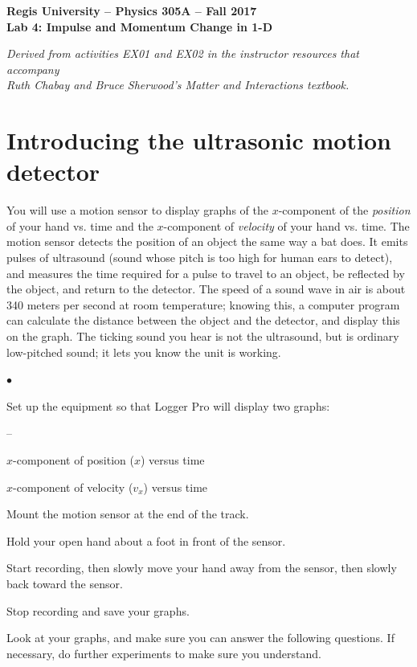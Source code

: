 \documentclass[11pt]{article}
\newcommand{\squishlist}{
   \begin{list}{$\bullet$}
    { \setlength{\itemsep}{0pt}      \setlength{\parsep}{3pt}
      \setlength{\topsep}{3pt}       \setlength{\partopsep}{0pt}
      \setlength{\leftmargin}{1.5em} \setlength{\labelwidth}{1em}
      \setlength{\labelsep}{0.5em} } }
\newcommand{\squishlistB}{
   \begin{list}{--}
    { \setlength{\itemsep}{0pt}      \setlength{\parsep}{3pt}
      \setlength{\topsep}{3pt}       \setlength{\partopsep}{0pt}
      \setlength{\leftmargin}{1.5em} \setlength{\labelwidth}{1em}
      \setlength{\labelsep}{0.5em} } }
\newcommand{\squishend}{
    \end{list}  }
\begin{document}
\begin{center}
\medskip
{\bf{Regis University -- Physics 305A -- Fall 2017}} \\
{\bf{Lab 4: Impulse and Momentum Change in 1-D}} \\
\medskip

{\em\footnotesize {Derived from activities EX01 and EX02 in the instructor resources that
 accompany \\ Ruth Chabay and Bruce Sherwood's {\em Matter and Interactions} 
 textbook.}}
\medskip
\end{center}

\section{Introducing the ultrasonic motion detector}

You will use a motion sensor to display graphs of the $x$-component of the {\em position} of your hand vs. time and the $x$-component of {\em velocity} of your hand vs. time.  The motion sensor detects the position of an object the same way a bat does.
It emits pulses of ultrasound (sound whose pitch is too high for human
ears to detect), and measures the time required for a pulse to travel to an
object, be reflected by the object, and return to the detector. The speed of
a sound wave in air is about 340 meters per second at room temperature; knowing this, a
computer program can calculate the distance between the object and the
detector, and display this on the graph.  The ticking sound you hear is not
the ultrasound, but is ordinary low-pitched sound; it lets you know the unit
is working.

\squishlist
\item Set up the equipment so that Logger Pro will display two graphs:
\squishlistB
\item $x$-component of position ($x$) versus time
\item $x$-component of velocity ($v_x$) versus time
\squishend
\item Mount the motion sensor at the end of the track.
\item Hold your open hand about a foot in front of the sensor.
\item Start recording, then slowly move your hand away from the sensor, then slowly back toward the sensor.
\item Stop recording and save your graphs.\\
\squishend

Look at your graphs, and make sure you can answer the following questions. If necessary, do further experiments to make sure you understand.\\
\end{document}
